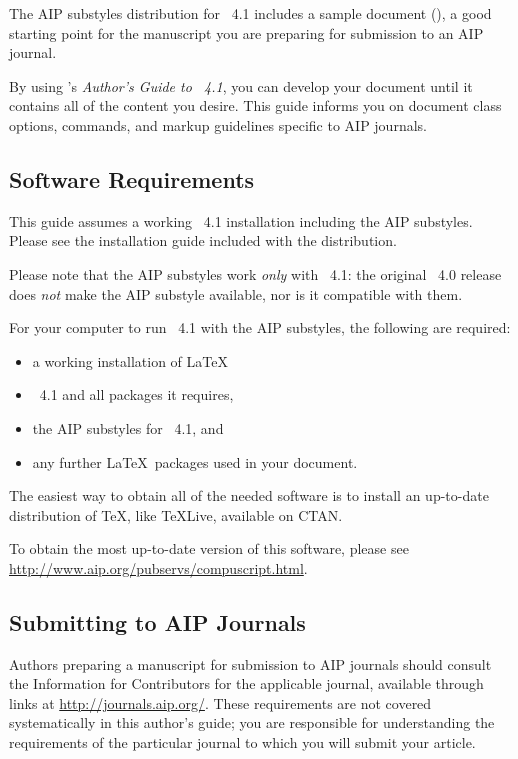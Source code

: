 \documentclass[%
 reprint,%
 amssymb, amsmath,%
 aip,cha,%
]{revtex4-1}
\begin{document}
The AIP substyles distribution for \revtex~4.1 includes 
a sample document (), 
a good starting point for 
the manuscript you are preparing for submission to an AIP journal.

By using \revtex's \textit{Author's Guide to \revtex~4.1}, you can develop your
document until it contains all of the content you desire.
This guide informs you on document class options, commands, and 
markup guidelines specific to AIP journals. 

\subsection{Software Requirements}

This guide assumes a working \revtex~4.1 installation including the AIP substyles. 
Please see the installation guide included with the distribution.\cite{Note1}

Please note that the AIP substyles work {\it only} with \revtex~4.1: 
the original \revtex~4.0 release does {\it not} make the AIP substyle available, nor is it compatible with them. 

For your computer to run \revtex~4.1 with the AIP substyles, the following are required:
\begin{itemize}
\item
a working installation of \LaTeX\,
\item
\revtex~4.1 and all packages it requires,
\item
the AIP substyles for \revtex~4.1, and
\item
any further \LaTeX\ packages used in your document. 
\end{itemize}

The easiest way to obtain all of the needed software is to install an up-to-date distribution of \TeX,
like \TeX Live, available on CTAN.

To obtain the most up-to-date version of this software, please see \url{http://www.aip.org/pubservs/compuscript.html}.


\subsection{Submitting to AIP Journals}

Authors preparing a manuscript for submission to
AIP journals should consult the Information for Contributors for the applicable journal,
available through links at \url{http://journals.aip.org/}. 
These requirements are not covered systematically in this author's guide; 
you are responsible for understanding the requirements of the particular journal to which
you will submit your article.
\end{document}
